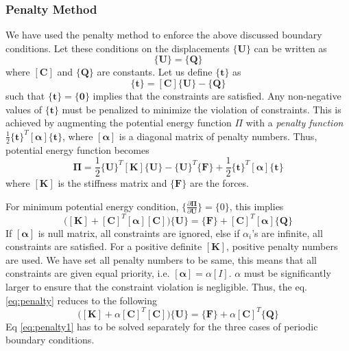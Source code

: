 \documentclass[10pt]{article}
\newcommand{\e}[1]{\textbf{#1}}
\begin{document}
\subsubsection{Penalty Method}
We have used the penalty method to enforce the above discussed boundary conditions. Let these conditions on the displacements $\{\e U\}$ can be written as
\begin{equation*}
[\textbf{C}]\{\textbf{U}\} = \{\textbf{Q}\}
\end{equation*}
where $[\textbf{C}]$ and $\{\textbf{Q}\}$ are constants. Let us define $\{\textbf{t}\}$ as
\begin{equation*}
\{\textbf{t}\} = [\textbf{C}]\{\textbf{U}\} - \{\textbf{Q}\}
\end{equation*}
such that $\{\textbf{t}\} = \{\textbf{0}\}$ implies that the constraints are satisfied. Any non-negative values of $\{\textbf{t}\}$ must be penalized to minimize the violation of constraints. This is achieved by augmenting the potential energy function\cite{Book:Cook} $\Pi$ with a \textit{penalty function} $\frac{1}{2}\{\textbf{t}\}^T[\bm\alpha]\{\textbf{t}\}$, where $[\bm\alpha]$ is a diagonal matrix of penalty numbers. Thus, potential energy function becomes
\begin{equation}
\bm\Pi = \frac{1}{2}\{\e U\}^T[\e K]\{\e U\} - \{\e U\}^T\{\e F\} + \frac{1}{2}\{\textbf{t}\}^T[\bm\alpha]\{\textbf{t}\}
\end{equation}
where $[\e K]$ is the stiffness matrix and $\{\e F\}$ are the forces.\par
For minimum potential energy condition, $\{\frac{\partial\bm\Pi}{\partial\e U}\} = \{0\}$, this implies
\begin{equation}
\label{eq:penalty}
\bigg([\e K]+[\e C]^T[\bm\alpha][\e C]\bigg)\{\e U\} = \{\e F\} + [\e C]^T[\bm\alpha]\{\e Q\}
\end{equation}
If $[\bm\alpha]$ is null matrix, all constraints are ignored, else if $\alpha_i$'s are infinite, all constraints are satisfied. For a positive definite $[\e K]$, positive penalty numbers are used. We have set all penalty numbers to be same, this means that all constraints are given equal priority, i.e. $[\bm\alpha] = \alpha[I]$. $\alpha$ must be significantly larger to ensure that the constraint violation is negligible. Thus, the eq. \eqref{eq:penalty} reduces to the following
\begin{equation}
\label{eq:penalty1}
\bigg([\e K]+\alpha[\e C]^T[\e C]\bigg)\{\e U\} = \{\e F\} + \alpha[\e C]^T\{\e Q\}
\end{equation}
Eq \eqref{eq:penalty1} has to be solved separately for the three cases of periodic boundary conditions.
\end{document}
